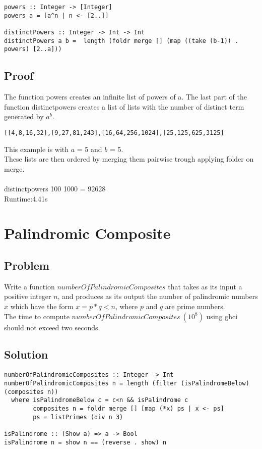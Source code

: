\documentclass[a4paper,11pt]{article}
\begin{document}
\begin{lstlisting}
powers :: Integer -> [Integer]
powers a = [a^n | n <- [2..]]

distinctPowers :: Integer -> Int -> Int
distinctPowers a b =  length (foldr merge [] (map ((take (b-1)) . powers) [2..a]))
\end{lstlisting}

\subsection{Proof}
The function powers creates an infinite list of powers of a. The last part of the function distinctpowers creates a list of lists with the number of distinct term generated by $a^b$.
\begin{lstlisting}
[[4,8,16,32],[9,27,81,243],[16,64,256,1024],[25,125,625,3125]
\end{lstlisting}
This example is with $a$ = 5 and $b$ = 5.\\
These lists are then ordered by merging them pairwise trough applying folder on merge.\\
\\
distinctpowers 100 1000 = 92628\\
Runtime:4.41s

\section{Palindromic Composite}
\subsection{Problem}
Write a function $numberOfPalindromicComposites$ that takes as its input a positive integer $n$, and
produces as its output the number of palindromic numbers $x$ which have the form $x=p*q<n$, where $p$
and $q$ are prime numbers.\\
The time to compute $numberOfPalindromicComposites\: (10^8)$ using ghci should not exceed
two seconds.

\subsection{Solution}

\begin{lstlisting}
numberOfPalindromicComposites :: Integer -> Int
numberOfPalindromicComposites n = length (filter (isPalindromeBelow) (composites n))
  where isPalindromeBelow c = c<n && isPalindrome c
        composites n = foldr merge [] [map (*x) ps | x <- ps]
        ps = listPrimes (div n 3)

isPalindrome :: (Show a) => a -> Bool
isPalindrome n = show n == (reverse . show) n
\end{lstlisting}
\end{document}
